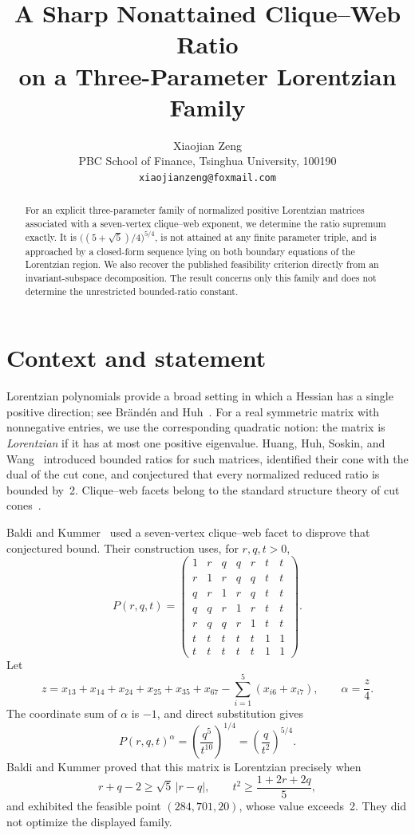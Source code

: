 \documentclass[11pt]{article}
\title{A Sharp Nonattained Clique--Web Ratio\\
on a Three-Parameter Lorentzian Family}
\author{Xiaojian Zeng\\
PBC School of Finance, Tsinghua University, 100190\\
\texttt{xiaojianzeng@foxmail.com}}
\date{}
\begin{document}
\maketitle

\begin{abstract}
For an explicit three-parameter family of normalized positive Lorentzian
matrices associated with a seven-vertex clique--web exponent, we determine
the ratio supremum exactly.  It is
\(\bigl((5+\sqrt5)/4\bigr)^{5/4}\), is not attained at any finite
parameter triple, and is approached by a closed-form sequence lying on both
boundary equations of the Lorentzian region.  We also recover the published
feasibility criterion directly from an invariant-subspace decomposition.
The result concerns only this family and does not determine the unrestricted
bounded-ratio constant.
\end{abstract}

\section{Context and statement}

Lorentzian polynomials provide a broad setting in which a Hessian has a
single positive direction; see Br\"and\'en and Huh~\cite{BrandenHuh2020}.
For a real symmetric matrix with nonnegative entries, we use the corresponding
quadratic notion: the matrix is \emph{Lorentzian} if it has at most one
positive eigenvalue.  Huang, Huh, Soskin, and Wang~\cite{HuangEtAl2025}
introduced bounded ratios for such matrices, identified their cone with the
dual of the cut cone, and conjectured that every normalized reduced ratio is
bounded by~2.  Clique--web facets belong to the standard structure theory of
cut cones~\cite[Sections~29.3--29.6]{DezaLaurent1997}.

Baldi and Kummer~\cite{BaldiKummer2026} used a seven-vertex clique--web facet
to disprove that conjectured bound.  Their construction uses, for
\(r,q,t>0\),
\[
P(r,q,t)=
\begin{pmatrix}
1&r&q&q&r&t&t\\
r&1&r&q&q&t&t\\
q&r&1&r&q&t&t\\
q&q&r&1&r&t&t\\
r&q&q&r&1&t&t\\
t&t&t&t&t&1&1\\
t&t&t&t&t&1&1
\end{pmatrix}.
\]
Let
\[
 z=x_{13}+x_{14}+x_{24}+x_{25}+x_{35}+x_{67}
   -\sum_{i=1}^{5}(x_{i6}+x_{i7}),
 \qquad \alpha=\frac{z}{4}.
\]
The coordinate sum of \(\alpha\) is \(-1\), and direct substitution gives
\begin{equation}\label{eq:objective}
 P(r,q,t)^\alpha
 =\left(\frac{q^5}{t^{10}}\right)^{1/4}
 =\left(\frac{q}{t^2}\right)^{5/4}.
\end{equation}
Baldi and Kummer proved that this matrix is Lorentzian precisely when
\begin{equation}\label{eq:feasible}
 r+q-2\geq \sqrt5\,|r-q|,
 \qquad
 t^2\geq \frac{1+2r+2q}{5},
\end{equation}
and exhibited the feasible point \((284,701,20)\), whose value exceeds~2.
They did not optimize the displayed family.
\end{document}
